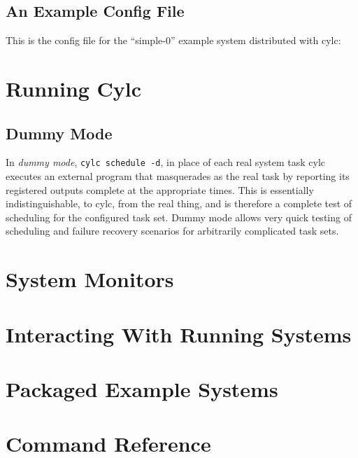 \documentclass[11pt,a4paper]{article}
\begin{document}
\pagebreak

\subsection{An Example Config File}

This is the config file for the ``simple-0'' example system distributed
with cylc: 

\lstset{ language=Python }
{

}

\pagebreak

\lstset{language=}

\pagebreak
\section{Running Cylc}

\label{sec:dummymode}
\subsection{Dummy Mode}

In {\em dummy mode}, \lstinline=cylc schedule -d=, in place of each real
system task cylc executes an external program that masquerades as the
real task by reporting its registered outputs complete at the appropriate
times. This is essentially indistinguishable, to cylc, from the real
thing, and is therefore a complete test of scheduling for the configured
task set. Dummy mode allows very quick testing of scheduling and failure
recovery scenarios for arbitrarily complicated task sets.


\section{System Monitors}

\section{Interacting With Running Systems}

\section{Packaged Example Systems}

\pagebreak
\section{Command Reference}
\end{document}

